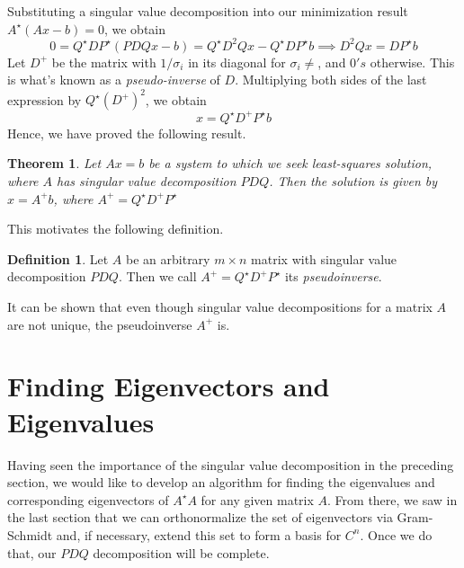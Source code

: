 \documentclass[12pt]{article}
\theoremstyle{plain}
\newtheorem{theorem}{Theorem}
\theoremstyle{definition}
\newtheorem*{definition}{Definition}
\theoremstyle{remark}
\numberwithin{equation}{section}  %
\begin{document}
Substituting a singular value decomposition into our minimization result $A^{\star}(Ax - b) = 0$, 
we obtain
\begin{equation*}
 0 = Q^{\star} D P^{\star}(PDQx - b) = Q^{\star} D^{2} Qx - Q^{\star}D P^{\star}b \implies D^{2}Qx = DP^{\star}b
\end{equation*}
Let $D^{+}$ be the matrix with $1/\sigma_i$ in its diagonal
for $\sigma_i \neq$, and $0's$ otherwise. This is what's known as a \emph{pseudo-inverse} of $D$. 
Multiplying both sides of the last expression by $Q^{\star}(D^{+})^{2}$, we obtain
\begin{equation*}
x =Q^{\star} D^{+} P^{\star} b  
\end{equation*}
Hence, we have proved the following result. 

\begin{theorem}
Let $Ax = b$ be a system to which we seek least-squares solution, where
$A$ has singular value decomposition $PDQ$.
Then the solution is given by $x = A^{+}b$, where $A^{+} = Q^{\star} D^{+} P^{\star}$
\end{theorem}
This motivates the following definition.
\begin{definition}
Let $A$ be an arbitrary $m \times n$ matrix with singular value decomposition $PDQ$. 
Then we call $A^{+} = Q^{\star}D^{+} P^{\star}$ its \emph{pseudoinverse}.
\end{definition}
It can be shown that even though singular value decompositions for a matrix $A$ are not
unique, the pseudoinverse $A^{+}$ is. 
\section{Finding Eigenvectors and Eigenvalues}
Having seen the importance of the singular value decomposition in the preceding
section, we would like to develop an algorithm for finding the eigenvalues and
corresponding eigenvectors of $A^{\star}A$ for any given matrix $A$. From there,
we saw in the last section that we can orthonormalize the set of eigenvectors
via Gram-Schmidt and, if necessary, extend this set to form a basis for $C^{n}$.
Once we do that, our $PDQ$ decomposition will be complete.
\end{document}
